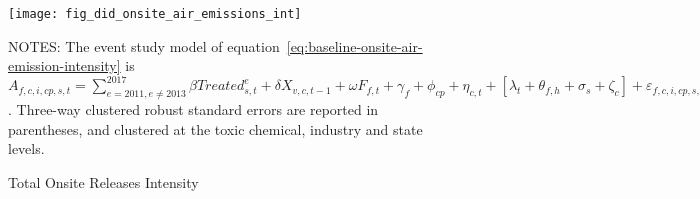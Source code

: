 \begin{figure}[H]
    \centering
    \texttt{[image: fig\_did\_onsite\_air\_emissions\_int]}
    \caption{Total Onsite Releases Intensity}
    \label{fig:baseline-onsite-air-emission-intensity}
    \begin{minipage}{12cm}
        \vspace{0.05in}
        NOTES: The event study model of equation~\ref{eq:baseline-onsite-air-emission-intensity} is $A_{f,c,i,cp,s,t} = \sum_{{e = 2011},{e \neq 2013}}^{2017} \beta Treated_{s,t}^e + \delta X_{v,c,t-1} + \omega F_{f,t} + \gamma_{f} + \phi_{cp} + \eta_{c,t} + \left[\lambda_{t} + \theta_{f,h} + \sigma_{s} + \zeta_{c} \right] + \varepsilon_{f,c,i,cp,s,t}$. Three-way clustered robust standard errors are reported in parentheses, and clustered at the toxic chemical, industry and state levels.
    \end{minipage}
\end{figure}